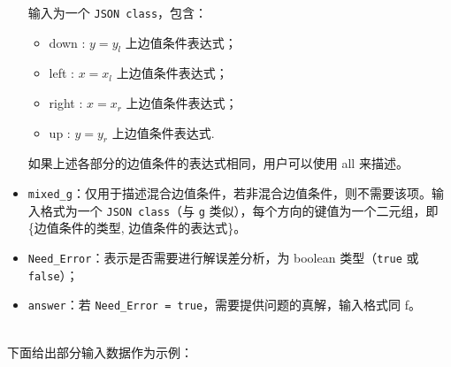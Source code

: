 \documentclass[lang=cn,a4paper,newtx,bibend=bibtex]{elegantpaper}
\begin{document}
\begin{itemize}
                       输入为一个 \texttt{JSON class}，包含：
                       \begin{itemize}[$\circ$]
                        \item down : $y = y_l$ 上边值条件表达式；
                        \item left : $x = x_l$ 上边值条件表达式；
                        \item right : $x = x_r$ 上边值条件表达式；
                        \item up : $y = y_r$ 上边值条件表达式.
                       \end{itemize}
                       如果上述各部分的边值条件的表达式相同，用户可以使用 all 来描述。
  \item \lstinline{mixed_g}：仅用于描述混合边值条件，若非混合边值条件，则不需要该项。输入格式为一个 \texttt{JSON class}（与 \texttt{g} 类似），每个方向的键值为一个二元组，即 \{边值条件的类型, 边值条件的表达式\}。
  \item \lstinline{Need_Error}：表示是否需要进行解误差分析，为 boolean 类型（\texttt{true} 或 \texttt{false}）；
  \item \lstinline{answer}：若 \texttt{Need\_Error = true}，需要提供问题的真解，输入格式同 f。
\end{itemize}
~~\\
下面给出部分输入数据作为示例：
\end{document}
